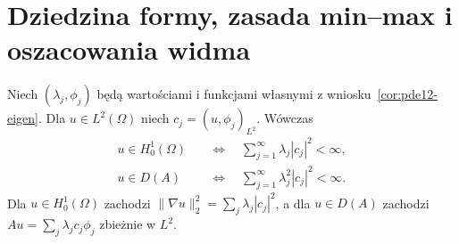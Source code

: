 \section{Dziedzina formy, zasada min--max i oszacowania widma}
\label{sec:pde12-minmax}

\begin{twierdzenie}
\label{thm:pde12-formdomain}
Niech $(\lambda_j,\phi_j)$ będą wartościami i funkcjami
własnymi z wniosku~\ref{cor:pde12-eigen}. Dla $u\in L^2(\Omega)$
niech $c_j=(u,\phi_j)_{L^2}$. Wówczas
\begin{align*}
u\in H_0^1(\Omega)
&\quad\Longleftrightarrow\quad
\sum_{j=1}^\infty\lambda_j|c_j|^2<\infty,\\
u\in D(A)
&\quad\Longleftrightarrow\quad
\sum_{j=1}^\infty\lambda_j^2|c_j|^2<\infty.
\end{align*}
Dla $u\in H_0^1(\Omega)$ zachodzi
$\|\nabla u\|_2^2=\sum_j\lambda_j|c_j|^2$,
a dla $u\in D(A)$ zachodzi
$Au=\sum_j\lambda_jc_j\phi_j$ zbieżnie w $L^2$.
\end{twierdzenie}
